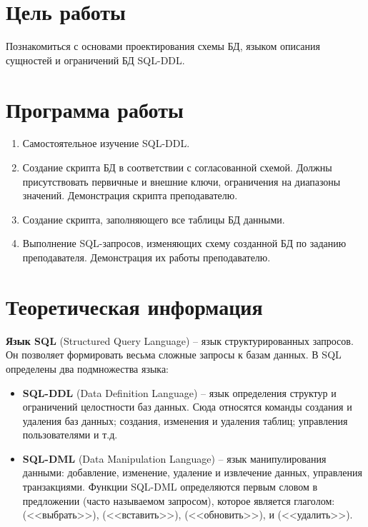 





\tableofcontents
\newpage

\section{Цель работы}

Познакомиться с основами проектирования схемы БД, языком описания сущностей и ограничений БД SQL-DDL.

\section{Программа работы}

\begin{enumerate}
	\item Самостоятельное изучение SQL-DDL.
	\item Создание скрипта БД в соответствии с согласованной схемой. Должны присутствовать первичные и внешние ключи, ограничения на диапазоны значений. Демонстрация скрипта преподавателю. 
	\item Создание скрипта, заполняющего все таблицы БД данными.
	\item Выполнение SQL-запросов, изменяющих схему созданной БД по заданию преподавателя. Демонстрация их работы преподавателю.
\end{enumerate}

\section{Теоретическая информация}

\textbf{Язык SQL} (Structured Query Language) -- язык структурированных запросов. Он позволяет формировать весьма сложные запросы к базам данных. В SQL определены два подмножества языка:

\begin{itemize}
	\item \textbf{SQL-DDL} (Data Definition Language) -- язык определения структур и ограничений целостности баз данных. Сюда относятся команды создания и удаления баз данных; создания, изменения и удаления таблиц; управления пользователями и т.д.
	\item \textbf{SQL-DML} (Data Manipulation Language) -- язык манипулирования данными: добавление, изменение, удаление и извлечение данных, управления транзакциями. Функции SQL-DML определяются первым словом в предложении (часто называемом запросом), которое является глаголом:  (<<выбрать>>),  (<<вставить>>),  (<<обновить>>), и  (<<удалить>>). 
\end{itemize}

